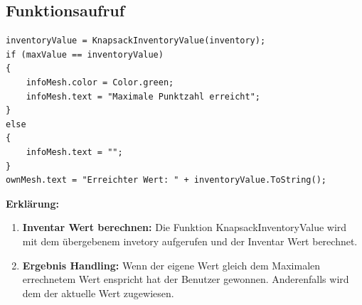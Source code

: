 \subsection*{Funktionsaufruf}
\begin{lstlisting}[style=csharp, caption={}, label=code:aufruf]
inventoryValue = KnapsackInventoryValue(inventory);
if (maxValue == inventoryValue)
{
    infoMesh.color = Color.green;
    infoMesh.text = "Maximale Punktzahl erreicht";
}
else
{
    infoMesh.text = "";
}
ownMesh.text = "Erreichter Wert: " + inventoryValue.ToString();
\end{lstlisting}
\textbf{Erklärung:}
\begin{enumerate}
    \item \textbf{Inventar Wert berechnen:} Die Funktion KnapsackInventoryValue wird mit dem übergebenem invetory aufgerufen und der Inventar Wert berechnet.
    \item \textbf{Ergebnis Handling:} Wenn der eigene Wert gleich dem Maximalen errechnetem Wert enspricht hat der Benutzer gewonnen. Anderenfalls wird dem  der aktuelle Wert zugewiesen.
\end{enumerate}

